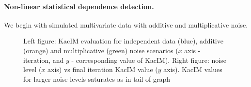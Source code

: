 \documentclass{article}
\begin{document}
\paragraph{Non-linear statistical dependence detection.} We begin with simulated multivariate data with additive and multiplicative noise.


\begin{figure}%
	\centering
	\qquad
	\caption{Left figure: KacIM evaluation for independent data (blue), additive (orange) and multiplicative (green) noise scenarios ($x$ axis - iteration, and $y$ - corresponding value of KacIM). Right figure: noise level ($x$ axis) vs final iteration KacIM value ($y$ axis). KacIM values for larger noise levels saturates as in tail of graph}
	\label{fig:experiments_simulation}
\end{figure}
\end{document}
